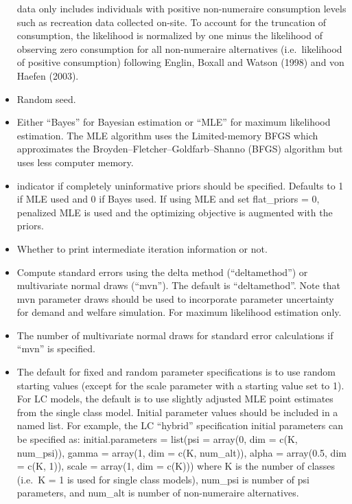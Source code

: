 \begin{itemize}
  data only includes individuals with positive non-numeraire consumption
  levels such as recreation data collected on-site. To account for the
  truncation of consumption, the likelihood is normalized by one minus
  the likelihood of observing zero consumption for all non-numeraire
  alternatives (i.e.~likelihood of positive consumption) following
  Englin, Boxall and Watson (1998) and von Haefen (2003).
\item
   Random seed.
\item
   Either ``Bayes'' for Bayesian estimation or ``MLE''
  for maximum likelihood estimation. The MLE algorithm uses the
  Limited-memory BFGS which approximates the
  Broyden--Fletcher--Goldfarb--Shanno (BFGS) algorithm but uses less
  computer memory.
\item
   indicator if completely uninformative priors
  should be specified. Defaults to 1 if MLE used and 0 if Bayes used. If
  using MLE and set flat\_priors = 0, penalized MLE is used and the
  optimizing objective is augmented with the priors.
\item
   Whether to print intermediate iteration
  information or not.
\item
   Compute standard errors using the delta method
  (``deltamethod'') or multivariate normal draws (``mvn''). The default
  is ``deltamethod''. Note that mvn parameter draws should be used to
  incorporate parameter uncertainty for demand and welfare simulation.
  For maximum likelihood estimation only.
\item
   The number of multivariate normal draws for standard
  error calculations if ``mvn'' is specified.
\item
   The default for fixed and random parameter
  specifications is to use random starting values (except for the scale
  parameter with a starting value set to 1). For LC models, the default
  is to use slightly adjusted MLE point estimates from the single class
  model. Initial parameter values should be included in a named list.
  For example, the LC ``hybrid'' specification initial parameters can be
  specified as: initial.parameters = list(psi = array(0, dim = c(K,
  num\_psi)), gamma = array(1, dim = c(K, num\_alt)), alpha = array(0.5,
  dim = c(K, 1)), scale = array(1, dim = c(K))) where K is the number of
  classes (i.e.~K = 1 is used for single class models), num\_psi is
  number of psi parameters, and num\_alt is number of non-numeraire
  alternatives.
\end{itemize}

